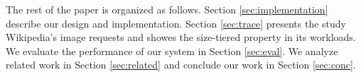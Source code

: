 
The rest of the paper is organized as follows. Section
\ref{sec:implementation} describe our design and implementation.
Section \ref{sec:trace} presents the study Wikipedia's image requests
and showes the size-tiered property in its workloads.  We evaluate the
performance of our system in Section \ref{sec:eval}. We analyze
related work in Section \ref{sec:related} and conclude our work in
Section \ref{sec:conc}.

